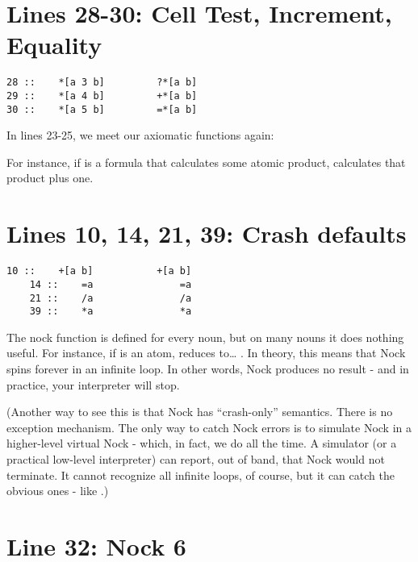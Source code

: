 \section{Lines 28-30: Cell Test, Increment, Equality}

\begin{framed_shaded}
\begin{Verbatim}[fontsize=\relsize{-2.5},fontseries=b,commandchars=\\\{\}]
28 ::    *[a 3 b]         ?*[a b]
29 ::    *[a 4 b]         +*[a b]
30 ::    *[a 5 b]         =*[a b]
\end{Verbatim}
\end{framed_shaded}
In lines 23-25, we meet our axiomatic functions again:

For instance, if  is a formula that calculates some atomic product, \kode{[4 x]}
calculates that product plus one. 

\section{Lines 10, 14, 21, 39: Crash defaults}

\begin{framed_shaded}
\begin{Verbatim}[fontsize=\relsize{-2.5},fontseries=b,commandchars=\\\{\}]
    10 ::    +[a b]           +[a b]
    14 ::    =a               =a
    21 ::    /a               /a
    39 ::    *a               *a
\end{Verbatim}
\end{framed_shaded}

The nock function is defined for every noun, but on many nouns it does nothing
useful.  For instance, if  is an atom,  reduces to\ldots{} .  In theory,
this means that Nock spins forever in an infinite loop.  In other words, Nock
produces no result - and in practice, your interpreter will stop.

(Another way to see this is that Nock has ``crash-only'' semantics.  There is no
exception mechanism.  The only way to catch Nock errors is to simulate Nock in
a higher-level virtual Nock - which, in fact, we do all the time.  A simulator
(or a practical low-level interpreter) can report, out of band, that Nock would
not terminate.  It cannot recognize all infinite loops, of course, but it can
catch the obvious ones - like .)

\section{Line 32: Nock 6}

